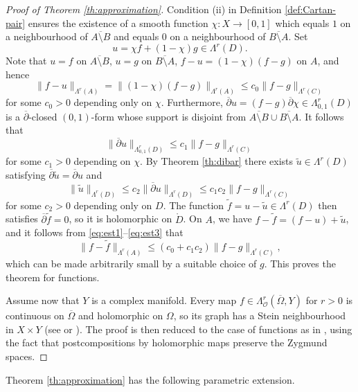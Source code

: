 \documentclass[11pt]{amsart}
\numberwithin{equation}{section}
\theoremstyle{definition}
\newcommand\Oscr{\mathscr{O}}
\newcommand\dibar{\overline\partial}
\begin{document}
\begin{proof}[Proof of Theorem \ref{th:approximation}]
Condition (ii) in Definition \ref{def:Cartan-pair}
ensures the existence of a smooth function $\chi: X \to[0,1]$ 
which equals $1$ on a neighbourhood of $\overline {A\setminus B}$ 
and equals $0$ on a neighbourhood of $\overline {B \setminus A}$. Set
\[
	u=\chi f+(1-\chi)g\in  \Lambda^r(D).
\] 
Note that $u=f$ on $\overline{A\setminus B}$, $u=g$ on 
$\overline{B\setminus A}$, $f-u = (1-\chi) (f-g)$ on $A$, and hence 
\begin{equation}\label{eq:est1}
	\|f-u\|_{\Lambda^r(A)}= \|(1-\chi) (f-g)\|_{\Lambda^r(A)}
	\le c_0 \|f-g\|_{\Lambda^r(C)}
\end{equation}
for some $c_0>0$ depending only on $\chi$.
Furthermore, $\dibar u = (f-g)\dibar\chi \in \Lambda^r_{0,1}(D)$ 
is a $\dibar$-closed $(0,1)$-form whose support is disjoint from 
$\overline{A\setminus B}\cup \overline{B\setminus A}$. It follows that 
\[ 
	\|\dibar u\|_{\Lambda^r_{0,1}(D)} \le c_1 \|f-g\|_{\Lambda^r(C)}
\] 
for some $c_1>0$ depending on $\chi$. 
By Theorem \ref{th:dibar} there exists $\tilde u\in \Lambda^r(D)$
satisfying $\dibar \tilde u=\dibar u$ and 
\begin{equation}\label{eq:est3}
	\|\tilde u\|_{\Lambda^r(D)}\le 
	c_2 \|\dibar u\|_{\Lambda^r(D)}
	\le c_1c_2 \|f-g\|_{\Lambda^r(C)}
\end{equation}
for some $c_2>0$ depending only on $D$.
The function $\tilde f=u-\tilde u \in \Lambda^r(D)$ then 
satisfies $\dibar \tilde f=0$, so it is holomorphic on $\mathring D$. 
On $A$, we have $f-\tilde f = (f - u) + \tilde u$, and it  
follows from \eqref{eq:est1}--\eqref{eq:est3} that 
\[
	\|f - \tilde f\|_{\Lambda^r(A)}\le (c_0+c_1c_2)\|f-g\|_{\Lambda^r(C)},
\]
which can be made arbitrarily small by a suitable choice of $g$.
This proves the theorem for functions.

Assume now that $Y$ is a complex manifold.
Every map $f\in \Lambda^r_\Oscr(\overline \Omega,Y)$ for $r>0$ 
is continuous on $\overline\Omega$ and holomorphic on $\Omega$, 
so its graph has a Stein neighbourhood in $X\times Y$
(see \cite[Theorem 1.2]{Forstneric2007AJM} or 
\cite[Corollary 8.11.2]{Forstneric2017E}). The proof is then reduced to 
the case of functions as in \cite[Theorem 8.11.4]{Forstneric2017E},
using the fact that postcompositions by holomorphic maps
preserve the Zygmund spaces.
\end{proof}

%
%
%
Theorem \ref{th:approximation} has the following parametric extension.
\end{document}
